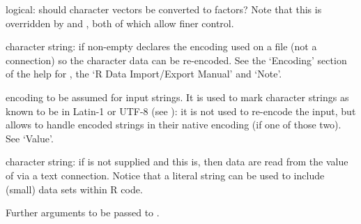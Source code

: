 \begin{Arguments}
\begin{ldescription}
\item[\code{stringsAsFactors}] logical: should character vectors be converted
to factors?  Note that this is overridden by  and
, both of which allow finer control.

\item[\code{fileEncoding}] character string: if non-empty declares the
encoding used on a file (not a connection) so the character data can
be re-encoded.  See the `Encoding' section of the help for
, the `R Data Import/Export Manual' and
`Note'.


\item[\code{encoding}] encoding to be assumed for input strings.  It is
used to mark character strings as known to be in
Latin-1 or UTF-8 (see ): it is not used to
re-encode the input, but allows \R{} to handle encoded strings in
their native encoding (if one of those two).  See `Value'.


\item[\code{text}] character string: if  is not supplied and this is, 
then data are read from the value of  via a text connection.
Notice that a literal string can be used to include (small) data sets 
within R code. 


\item[\code{...}] Further arguments to be passed to .
\end{ldescription}
\end{Arguments}
%
